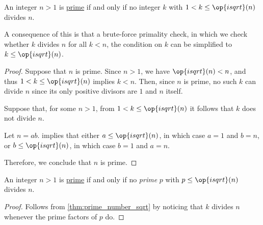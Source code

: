 \begin{proposition}\label{thm:prime_number_sqrt}
  An integer \( n > 1 \) is \hyperref[def:prime_number]{prime} if and only if no integer \( k \) with \( 1 < k \leq \op{isqrt}(n) \) divides \( n \).
\end{proposition}
\begin{comments}
  \item A consequence of this is that a brute-force primality check, in which we check whether \( k \) divides \( n \) for all \( k < n \), the condition on \( k \) can be simplified to \( k \leq \op{isqrt}(n) \).
\end{comments}
\begin{proof}
  \SufficiencySubProof Suppose that \( n \) is prime. Since \( n > 1 \), we have \( \op{isqrt}(n) < n \), and thus \( 1 < k \leq \op{isqrt}(n) \) implies \( k < n \). Then, since \( n \) is prime, no such \( k \) can divide \( n \) since its only positive divisors are \( 1 \) and \( n \) itself.

  \NecessitySubProof Suppose that, for some \( n > 1 \), from \( 1 < k \leq \op{isqrt}(n) \) it follows that \( k \) does not divide \( n \).

  Let \( n = ab \).  implies that either \( a \leq \op{isqrt}(n) \), in which case \( a = 1 \) and \( b = n \), or \( b \leq \op{isqrt}(n) \), in which case \( b = 1 \) and \( a = n \).

  Therefore, we conclude that \( n \) is prime.
\end{proof}

\begin{corollary}\label{thm:prime_number_sqrt_prime}
  An integer \( n > 1 \) is \hyperref[def:prime_number]{prime} if and only if no \emph{prime} \( p \) with \( p \leq \op{isqrt}(n) \) divides \( n \).
\end{corollary}
\begin{proof}
  Follows from \cref{thm:prime_number_sqrt} by noticing that \( k \) divides \( n \) whenever the prime factors of \( p \) do.
\end{proof}

